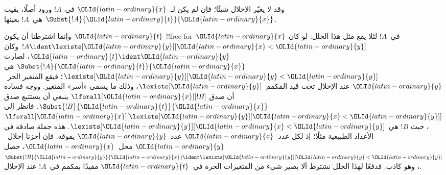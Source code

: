 \documentclass[../../../include/open-logic-section]{subfiles}
\begin{document}
\begin{defn}
\begin{enumerate}


\end{enumerate}
\end{defn}

\begin{explain}
وقد لا يغيّر الإحلال شيئًا؛ فإن لم يكن لـ~$\OLId{latin-ordinary}{x}$ في~$!A$ ورود أصلًا،
بقيت $\Subst{!A}{\OLId{latin-ordinary}{t}}{\OLId{latin-ordinary}{x}}$ هي~$!A$ بعينها.

وإنما اشترطنا أن يكون~$\OLId{latin-ordinary}{t}$ !!{free for}~$\OLId{latin-ordinary}{x}$ في~$!A$ لئلا يقع
مثل هذا الخلل: لو كان $!A \ident \lexists[\OLId{latin-ordinary}{y}][\OLId{latin-ordinary}{x} < \OLId{latin-ordinary}{y}]$ وكان $\OLId{latin-ordinary}{t} \ident \OLId{latin-ordinary}{y}$،
لصارت $\Subst{!A}{\OLId{latin-ordinary}{t}}{\OLId{latin-ordinary}{x}}$ هي $\lexists[\OLId{latin-ordinary}{y}][\OLId{latin-ordinary}{y} < \OLId{latin-ordinary}{y}]$؛ فيقع المتغير
الحر~$\OLId{latin-ordinary}{y}$ عند الإحلال تحت قيد المكمم~$\lexists[\OLId{latin-ordinary}{y}]$، وذلك ما يسمى
«أسر» المتغير. ووجه فساده أن صدق $\lforall[\OLId{latin-ordinary}{x}][!B]$ ينبغي أن يستتبع
صدق $\Subst{!B}{\OLId{latin-ordinary}{t}}{\OLId{latin-ordinary}{x}}$. فانظر إلى
$\lforall[\OLId{latin-ordinary}{x}][\lexists[\OLId{latin-ordinary}{y}][\OLId{latin-ordinary}{x} < \OLId{latin-ordinary}{y}]]$، حيث $!B$ هي $\lexists[\OLId{latin-ordinary}{y}][\OLId{latin-ordinary}{x} <
  \OLId{latin-ordinary}{y}]$. هذه جملة صادقة في الأعداد الطبيعية مثلًا؛ إذ لكل عدد~$\OLId{latin-ordinary}{x}$
عدد~$\OLId{latin-ordinary}{y}$ يفوقه. فإن أجزنا إحلال~$\OLId{latin-ordinary}{y}$ محل~$\OLId{latin-ordinary}{x}$، حصل
$\Subst{!B}{\OLId{latin-ordinary}{y}}{\OLId{latin-ordinary}{x}} \ident \lexists[\OLId{latin-ordinary}{y}][\OLId{latin-ordinary}{y} < \OLId{latin-ordinary}{y}]$، وهو كاذب.
فدفعًا لهذا الخلل نشترط ألا يصير شيء من المتغيرات الحرة في~$\OLId{latin-ordinary}{t}$
مقيدًا بمكمم في~$!A$ عند الإحلال.
\end{explain}
\end{document}
